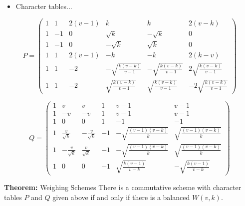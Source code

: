 \documentclass{beamer}
\begin{document}
\begin{frame}

  \begin{itemize}
  \item Character tables...
  \end{itemize}

  \[
    P = \begin{pmatrix}
          1 & 1 & 2(v-1) & k & k & 2(v-k) \\
          1 & -1 & 0 & \sqrt{k} & -\sqrt{k} & 0 \\
          1 & -1 & 0 & -\sqrt{k} & \sqrt{k} & 0 \\
          1 & 1 & 2(v-1) & -k & -k & 2(k-v) \\
          1 & 1 & -2 & -\sqrt{\frac{k(v-k)}{v-1}} & -\sqrt{\frac{k(v-k)}{v-1}} & 2\sqrt{\frac{k(v-k)}{v-1}} \\
          1 & 1 & -2 & \sqrt{\frac{k(v-k)}{v-1}} & \sqrt{\frac{k(v-k)}{v-1}} & -2\sqrt{\frac{k(v-k)}{v-1}}
        \end{pmatrix}
  \]
  
\end{frame}

\begin{frame}

  \[
    Q = \begin{pmatrix}
          1 & v & v & 1 & v-1 & v-1 \\
          1 & -v & -v & 1 & v-1 & v-1 \\
          1 & 0 & 0 & 1 & -1 & -1 \\
          1 & \frac{v}{\sqrt{k}} & -\frac{v}{\sqrt{k}} & -1 & -\sqrt{\frac{(v-1)(v-k)}{k}} & \sqrt{\frac{(v-1)(v-k)}{k}} \\
          1 & -\frac{v}{\sqrt{k}} & \frac{v}{\sqrt{k}} & -1 & -\sqrt{\frac{(v-1)(v-k)}{k}} & \sqrt{\frac{(v-1)(v-k)}{k}} \\
          1 & 0 & 0 & -1 & \sqrt{\frac{k(v-1)}{v-k}} & -\sqrt{\frac{k(v-1)}{v-k}}
        \end{pmatrix}
  \]
  
\end{frame}

\begin{frame}

  \begin{block}{{\bf Theorem:} Weighing Schemes \cite[][]{new-bw}}
    There is a commutative scheme with character tables $P$ and $Q$ given above
    if and only if there is a balanced $W(v,k)$.
  \end{block}
  
\end{frame}
\end{document}
